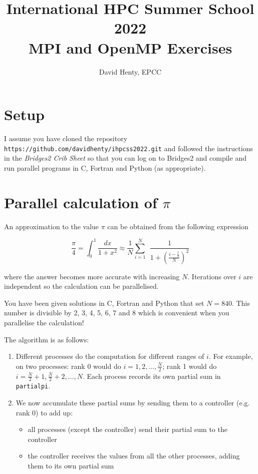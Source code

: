 \documentclass{article}
\title{International HPC Summer School 2022 \\
  MPI and OpenMP Exercises}
\begin{document}
\author{David Henty, EPCC}

\date{}

\makeEPCCtitle

\vspace{-1.0cm}

\section{Setup}

I assume you have cloned the repository
\texttt{https://github.com/davidhenty/ihpcss2022.git} and followed the
instructions in the {\em Bridges2 Crib Sheet} so that you can log on
to Bridges2 and compile and run parallel programs in C, Fortran and
Python (as appropriate).

\section{Parallel calculation of $\pi$}

An approximation to the value $\pi$ can be obtained from the
following expression

\[
\frac{\pi}{4} = \int_0^1 \frac{dx}{1 + x^2}
\approx \frac{1}{N} \sum_{i=1}^{N} \ \ \frac{1}{1 + \left(
\frac{i-\frac{1}{2}}{N} \right) ^2}
\]

where the answer becomes more accurate with increasing $N$. Iterations
over $i$ are independent so the calculation can be parallelised.

You have been given solutions in C, Fortran and Python that set $N =
840$. This number is divisible by 2, 3, 4, 5, 6, 7 and 8 which is
convenient when you parallelise the calculation!

The algorithm is as follows:

\begin{enumerate}

\item Different processes do the computation for different ranges of
  $i$. For example, on two processes: rank 0 would do $i = 1, 2,
  \ldots, \frac{N}{2}$; rank 1 would do $i = \frac{N}{2}+1,
  \frac{N}{2}+2, \ldots, N$. Each process records its own partial sum
  in \texttt{partialpi}.

\item We now accumulate these partial sums by sending them to
a controller (e.g. rank 0) to add up:

\begin{itemize}

\item all processes (except the controller) send their partial sum to the
controller

\item the controller receives the values from all the other processes,
adding them to its own partial sum

\end{itemize}

\end{enumerate}
\end{document}
